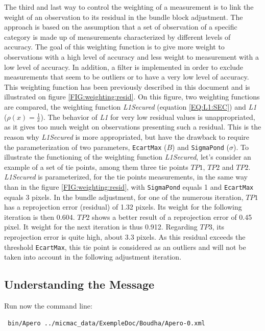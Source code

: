 The third and last way to control the weighting of a measurement is to link the weight of an observation to its residual in the bundle block adjustment. 
The approach is based on the assumption that a set of observation of a specific category is made up of measurements characterized by different levels of accuracy. The goal of this weighting function is to give more weight to observations with a high level of accuracy and less weight to measurement with a low level of accuracy.
In addition, a filter is implemented in order to exclude measurements that seem to be outliers or to have a very low level of accuracy. 
This weighting function has been previously described in this document and is illustrated on figure \ref{FIG:weighting:resid}. 
On this figure, two weighting functions are compared, the weighting function {\it L1Secured} (equation \ref{EQ:L1:SEC}) and {\it L1} ($\rho(x)=\frac1x$). 
The behavior of {\it L1} for very low residual values is unappropriated, as it gives too much weight on observations presenting such a residual. 
This is the reason why {\it L1Secured} is more appropriated, but have the drawback to require the parameterization of two parameters, {\tt EcartMax}  ($B$) and {\tt SigmaPond}  ($\sigma$). 
To illustrate the functioning of the weighting function {\it L1Secured}, let's consider an example of a set of tie points, among them three tie points $TP1$, $TP2$ and $TP2$. 
{\it L1Secured} is parameterized, for the tie points measurements, in the same way than in the figure \ref{FIG:weighting:resid}, with {\tt SigmaPond} equals 1 and {\tt EcartMax} equals 3 pixels. 
In the bundle adjustment, for one of the numerous iteration, $TP1$ has a reprojection error (residual) of 1.32 pixels. 
Its weight for the following iteration is then 0.604. 
$TP2$ shows a better result of a reprojection error of 0.45 pixel. 
It weight for the next iteration is thus 0.912. 
Regarding $TP3$, its reprojection error is quite high, about 3.3 pixels. 
As this residual exceeds the threshold {\tt EcartMax}, this tie point is considered as an outliers and will not be taken into account in the following adjustment iteration.



\subsection{Understanding the Message}

Run now the command line:

{\scriptsize
\begin{verbatim}
 bin/Apero ../micmac_data/ExempleDoc/Boudha/Apero-0.xml 
\end{verbatim}
}

